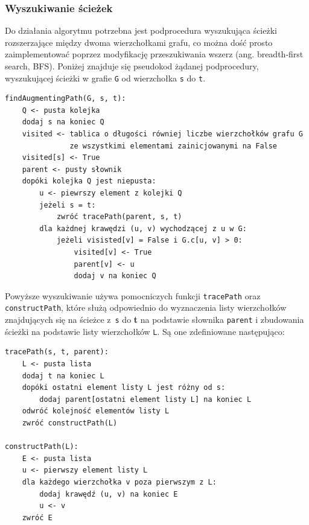 \documentclass[12pt,a4paper]{article}
\theoremstyle{definition}
\begin{document}
\subsubsection{Wyszukiwanie ścieżek}
Do działania algorytmu potrzebna jest podprocedura wyszukująca ścieżki rozszerzające między dwoma wierzchołkami grafu, co można dość prosto zaimplementować poprzez modyfikację przeszukiwania wszerz (ang. breadth-first search, BFS). Poniżej znajduje się pseudokod żądanej podprocedury, wyszukującej ścieżki w grafie \texttt{G} od wierzchołka \texttt{s} do \texttt{t}.\\

\begin{tcolorbox}[title=Wyszukiwanie ścieżek rozszerzających w grafie]
\begin{verbatim}
findAugmentingPath(G, s, t):
    Q <- pusta kolejka
    dodaj s na koniec Q
    visited <- tablica o długości równiej liczbe wierzchołków grafu G
               ze wszystkimi elementami zainicjowanymi na False
    visited[s] <- True
    parent <- pusty słownik
    dopóki kolejka Q jest niepusta:
        u <- piewrszy element z kolejki Q
        jeżeli s = t:
            zwróć tracePath(parent, s, t)
        dla każdnej krawędzi (u, v) wychodzącej z u w G:
            jeżeli visisted[v] = False i G.c[u, v] > 0:
                visited[v] <- True
                parent[v] <- u
                dodaj v na koniec Q
\end{verbatim}
\end{tcolorbox}

\vspace{0.5em}
\noindent
Powyższe wyszukiwanie używa pomocniczych funkcji \texttt{tracePath} oraz \texttt{constructPath}, które służą odpowiednio do wyznaczenia listy wierzchołków znajdujących się na ścieżce z~\texttt{s} do \textbf{t} na podstawie słownika \texttt{parent} i zbudowania ścieżki na podstawie listy wierzchołków \texttt{L}. Są one zdefiniowane następująco:\\

\begin{tcolorbox}[title=Funkcje pomocniczne do budowania ścieżki]
\begin{verbatim}
tracePath(s, t, parent):
    L <- pusta lista
    dodaj t na koniec L
    dopóki ostatni element listy L jest różny od s:
        dodaj parent[ostatni element listy L] na koniec L
    odwróć kolejność elementów listy L
    zwróć constructPath(L)

constructPath(L):
    E <- pusta lista
    u <- pierwszy element listy L
    dla każdego wierzchołka v poza pierwszym z L:
        dodaj krawędź (u, v) na koniec E
        u <- v
    zwróć E
\end{verbatim}
\end{tcolorbox}
\end{document}
